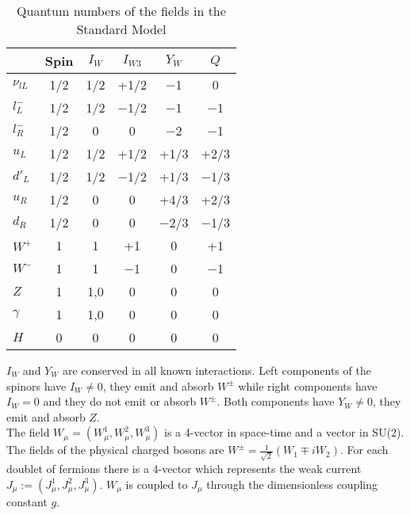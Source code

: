 \documentclass[10.75pt,a4paper,openright,bottom=2cm]{article}
\begin{document}
\begin{table}[h]
    \centering
    \begin{tabular}{l|ccccc}
    \hline
    \cellcolor{gray!50} & \cellcolor{yellow!50}Spin & \cellcolor{yellow!50}$I_W$ & \cellcolor{yellow!50}$I_{W3}$ & \cellcolor{yellow!50}$Y_W$ & \cellcolor{yellow!50}$Q$\\
    \hline\hline
    \cellcolor{orange!50}$\nu_{lL}$ & 1/2 & 1/2 & +1/2 & $-$1 & 0 \\
    \hline
    \cellcolor{orange!50}$l^-_L$ & 1/2 & 1/2 & $-$1/2 & $-$1 & $-$1 \\
    \hline
    \cellcolor{orange!50}$l^-_R$ & 1/2 & 0 & 0 & $-$2 & $-$1 \\
    \hline
    \cellcolor{orange!50}$u_{L}$ & 1/2 & 1/2 & +1/2 & +1/3 & +2/3 \\
    \hline
    \cellcolor{orange!50}$d'_{L}$ & 1/2 & 1/2 & $-$1/2 & +1/3 & $-$1/3 \\
    \hline
    \cellcolor{orange!50}$u_{R}$ & 1/2 & 0 & 0 & +4/3 & +2/3 \\
    \hline
    \cellcolor{orange!50}$d_{R}$ & 1/2 & 0 & 0 & $-$2/3 & $-$1/3 \\
    \hline\hline
    \cellcolor{blue!50}$W^+$ & 1 & 1 & +1 & 0 & +1 \\
    \hline
    \cellcolor{blue!50}$W^-$ & 1 & 1 & $-$1 & 0 & $-$1 \\
    \hline
    \cellcolor{blue!50}$Z$ & 1 & 1,0 & 0 & 0 & 0 \\
    \hline
    \cellcolor{blue!50}$\gamma$ & 1 & 1,0 & 0 & 0 & 0 \\
    \hline\hline
    \cellcolor{purple!50}$H$ & 0 & 0 & 0 & 0 & 0\\
    \hline
    \end{tabular}
    \caption{Quantum numbers of the fields in the Standard Model}
    \label{aaa}
\end{table}\newline
$I_W$ and $Y_W$ are conserved in all known interactions. Left components of the spinors have $I_W\neq0$, they emit and absorb $W^\pm$ while right components have $I_W=0$ and they do not emit or absorb $W^\pm$. Both components have $Y_W\neq0$, they emit and absorb $Z$.\\
The field $W_\mu=(W_\mu^1,W_\mu^2,W_\mu^3)$ is a 4-vector in space-time and a vector in SU(2). The fields of the physical charged bosons are $W^\pm=\frac{1}{\sqrt{2}}(W_1\mp iW_2)$. For each doublet of fermions there is a 4-vector which represents the weak current $J_\mu:=(J_\mu^1,J_\mu^2,J_\mu^3)$. $W_\mu$ is coupled to $J_\mu$ through the dimensionless coupling constant $g$.\\
\end{document}

